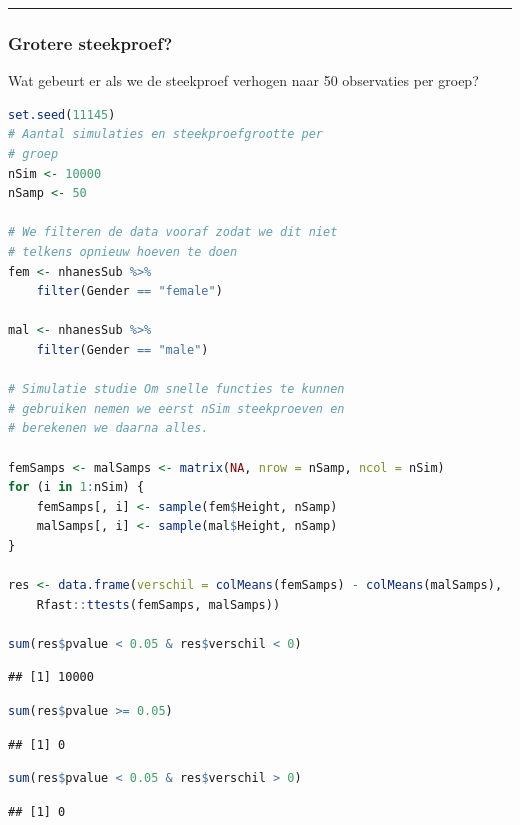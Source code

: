 \documentclass[
  12pt,dutch,coursenotes]{book}
\begin{document}
\begin{center}\rule{0.5\linewidth}{0.5pt}\end{center}

\hypertarget{grotere-steekproef}{%
\subsubsection{Grotere steekproef?}\label{grotere-steekproef}}

Wat gebeurt er als we de steekproef verhogen naar 50 observaties per groep?

\begin{lstlisting}[language=R]
set.seed(11145)
# Aantal simulaties en steekproefgrootte per
# groep
nSim <- 10000
nSamp <- 50

# We filteren de data vooraf zodat we dit niet
# telkens opnieuw hoeven te doen
fem <- nhanesSub %>%
    filter(Gender == "female")

mal <- nhanesSub %>%
    filter(Gender == "male")

# Simulatie studie Om snelle functies te kunnen
# gebruiken nemen we eerst nSim steekproeven en
# berekenen we daarna alles.

femSamps <- malSamps <- matrix(NA, nrow = nSamp, ncol = nSim)
for (i in 1:nSim) {
    femSamps[, i] <- sample(fem$Height, nSamp)
    malSamps[, i] <- sample(mal$Height, nSamp)
}

res <- data.frame(verschil = colMeans(femSamps) - colMeans(malSamps),
    Rfast::ttests(femSamps, malSamps))

sum(res$pvalue < 0.05 & res$verschil < 0)
\end{lstlisting}

\begin{lstlisting}
## [1] 10000
\end{lstlisting}

\begin{lstlisting}[language=R]
sum(res$pvalue >= 0.05)
\end{lstlisting}

\begin{lstlisting}
## [1] 0
\end{lstlisting}

\begin{lstlisting}[language=R]
sum(res$pvalue < 0.05 & res$verschil > 0)
\end{lstlisting}

\begin{lstlisting}
## [1] 0
\end{lstlisting}
\end{document}
